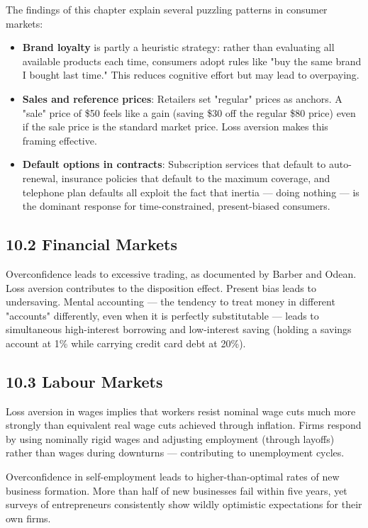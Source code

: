 \documentclass[12pt, letterpaper]{article}
\begin{document}
The findings of this chapter explain several puzzling patterns in consumer markets:

\begin{itemize}
\item \textbf{Brand loyalty} is partly a heuristic strategy: rather than evaluating all available products each time, consumers adopt rules like "buy the same brand I bought last time." This reduces cognitive effort but may lead to overpaying.
\item \textbf{Sales and reference prices}: Retailers set "regular" prices as anchors. A "sale" price of \$50 feels like a gain (saving \$30 off the regular \$80 price) even if the sale price is the standard market price. Loss aversion makes this framing effective.
\item \textbf{Default options in contracts}: Subscription services that default to auto-renewal, insurance policies that default to the maximum coverage, and telephone plan defaults all exploit the fact that inertia --- doing nothing --- is the dominant response for time-constrained, present-biased consumers.
\end{itemize}


\subsection{10.2 Financial Markets}


Overconfidence leads to excessive trading, as documented by Barber and Odean. Loss aversion contributes to the disposition effect. Present bias leads to undersaving. Mental accounting --- the tendency to treat money in different "accounts" differently, even when it is perfectly substitutable --- leads to simultaneous high-interest borrowing and low-interest saving (holding a savings account at 1\% while carrying credit card debt at 20\%).


\subsection{10.3 Labour Markets}


Loss aversion in wages implies that workers resist nominal wage cuts much more strongly than equivalent real wage cuts achieved through inflation. Firms respond by using nominally rigid wages and adjusting employment (through layoffs) rather than wages during downturns --- contributing to unemployment cycles.

Overconfidence in self-employment leads to higher-than-optimal rates of new business formation. More than half of new businesses fail within five years, yet surveys of entrepreneurs consistently show wildly optimistic expectations for their own firms.
\end{document}
